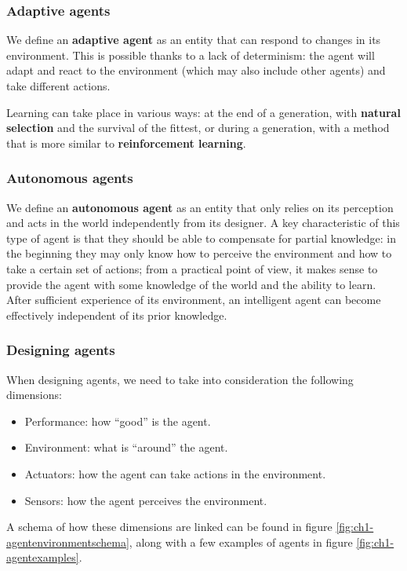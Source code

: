 \subsubsection{Adaptive agents}
We define an \textbf{adaptive agent} as an entity that can respond to changes in its environment. This is possible thanks to a lack of determinism: the agent will adapt and react to the environment (which may also include other agents) and take different actions.

Learning can take place in various ways: at the end of a generation, with \textbf{natural selection} and the survival of the fittest, or during a generation, with a method that is more similar to \textbf{reinforcement learning}.

\subsubsection{Autonomous agents}
We define an \textbf{autonomous agent} as an entity that only relies on its perception and acts in the world independently from its designer. A key characteristic of this type of agent is that they should be able to compensate for partial knowledge: in the beginning they may only know how to perceive the environment and how to take a certain set of actions; from a practical point of view, it makes sense to provide the agent with some knowledge of the world and the ability to learn. After sufficient experience of its environment, an intelligent agent can become effectively independent of its prior knowledge.

\subsubsection{Designing agents}
When designing agents, we need to take into consideration the following dimensions:
\begin{itemize}
    \item Performance: how ``good'' is the agent.
    \item Environment: what is ``around'' the agent.
    \item Actuators: how the agent can take actions in the environment.
    \item Sensors: how the agent perceives the environment.
\end{itemize}

A schema of how these dimensions are linked can be found in figure \ref{fig:ch1-agentenvironmentschema}, along with a few examples of agents in figure \ref{fig:ch1-agentexamples}.

